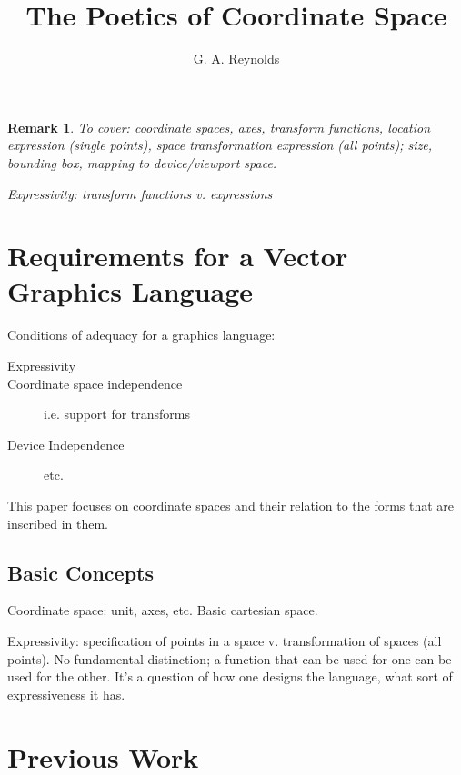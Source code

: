 \documentclass{tufte-handout}
\title{The Poetics of Coordinate Space}
\author{G. A. Reynolds}
\numberwithin{equation}{subsection}
\newtheorem{remark}{Remark}
\begin{document}
\maketitle

\tableofcontents

\begin{remark}
  To cover: coordinate spaces, axes, transform functions, location
  expression (single points), space transformation expression (all
  points); size, bounding box, mapping to device/viewport space.

  Expressivity:  transform functions v. expressions
\end{remark}

\section{Requirements for a Vector Graphics Language}
\label{sec:drawing}


Conditions of adequacy for a graphics language:

\begin{description}
\item [Expressivity]
\item [Coordinate space independence] i.e. support for transforms
\item [Device Independence]
\item [] etc.
\end{description}


This paper focuses on coordinate spaces and their relation to the
forms that are inscribed in them.

\subsection{Basic Concepts}

Coordinate space:  unit, axes, etc.  Basic cartesian space.

Expressivity: specification of points in a space v. transformation of
spaces (all points).  No fundamental distinction; a function that can
be used for one can be used for the other.  It's a question of how one
designs the language, what sort of expressiveness it has.


\section{Previous Work}
\label{sec:prevwork}
\end{document}
